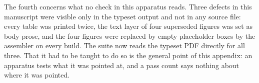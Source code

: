 The fourth concerns what no check in this apparatus reads. Three defects in this manuscript were visible only in the typeset output and not in any source file: every table was printed twice, the text layer of four superseded figures was set as body prose, and the four figures were replaced by empty placeholder boxes by the assembler on every build. The suite now reads the typeset PDF directly for all three. That it had to be taught to do so is the general point of this appendix: an apparatus tests what it was pointed at, and a pass count says nothing about where it was pointed.
